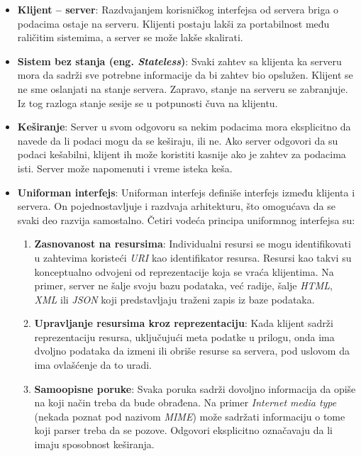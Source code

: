 \begin{itemize}

	\item \textbf{Klijent -- server}: Razdvajanjem korisničkog interfejsa od servera briga o podacima 
	ostaje na serveru. Klijenti postaju lakši za portabilnost među raličitim sistemima, a server se može
    lakše skalirati.
	
    \item \textbf{Sistem bez stanja (eng. \textit{Stateless})}: Svaki zahtev sa klijenta ka serveru mora da sadrži 
	sve potrebne informacije da bi zahtev bio opslužen. Klijent se ne sme oslanjati na stanje servera. 
    Zapravo, stanje na serveru se zabranjuje. Iz tog razloga stanje sesije se u potpunosti čuva na klijentu.
	
    \item \textbf{Keširanje}: Server u svom odgovoru sa nekim podacima mora eksplicitno da navede da li 
    podaci mogu da se keširaju, ili ne. Ako server odgovori da su podaci kešabilni, klijent ih može 
    koristiti kasnije ako je zahtev za podacima isti. Server može napomenuti i vreme isteka keša.
    
    \item \textbf{Uniforman interfejs}: Uniforman interfejs definiše interfejs između klijenta i servera.
    On pojednostavljuje i razdvaja arhitekturu, što omogućava da se svaki deo razvija samostalno. 
    Četiri vodeća principa uniformnog interfejsa su:

    \begin{enumerate}
        \item \textbf{Zasnovanost na resursima}: Individualni resursi se mogu identifikovati u 
        zahtevima koristeći \textit{URI} kao identifikator resursa. Resursi kao takvi su konceptualno odvojeni 
        od reprezentacije koja se vraća klijentima. Na primer, server ne šalje svoju bazu podataka, 
        već radije, šalje \textit{HTML}, \textit{XML} ili \textit{JSON} koji predstavljaju traženi zapis iz baze podataka.

        \item \textbf{Upravljanje resursima kroz reprezentaciju}: Kada klijent sadrži reprezentaciju resursa,
        uključujući meta podatke u prilogu, onda ima dvoljno podataka da izmeni ili obriše resurse 
        sa servera, pod uslovom da ima ovlašćenje da to uradi.

        \item \textbf{Samoopisne poruke}: Svaka poruka sadrži dovoljno informacija da opiše na koji 
        način treba da bude obrađena. Na primer \textit{Internet media type} (nekada poznat pod nazivom \textit{MIME}) 
        može sadržati informaciju o tome koji parser treba da se pozove. Odgovori eksplicitno 
        označavaju da li imaju sposobnost keširanja.


\end{enumerate}
\end{itemize}
